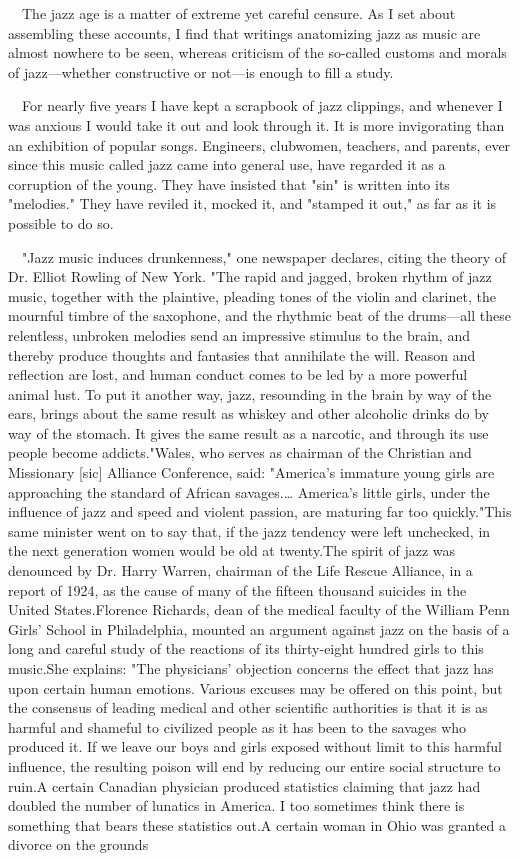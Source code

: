 \begin{gquote}
　The jazz age is a matter of extreme yet careful censure. As I set about assembling these accounts, I find that writings anatomizing jazz as music are almost nowhere to be seen, whereas criticism of the so-called customs and morals of jazz—whether constructive or not—is enough to fill a study.\par{}　For nearly five years I have kept a scrapbook of jazz clippings, and whenever I was anxious I would take it out and look through it. It is more invigorating than an exhibition of popular songs. Engineers, clubwomen, teachers, and parents, ever since this music called jazz came into general use, have regarded it as a corruption of the young. They have insisted that "sin" is written into its "melodies." They have reviled it, mocked it, and "stamped it out," as far as it is possible to do so.\par{}　"Jazz music induces drunkenness," one newspaper declares, citing the theory of Dr. Elliot Rowling of New York. "The rapid and jagged, broken rhythm of jazz music, together with the plaintive, pleading tones of the violin and clarinet, the mournful timbre of the saxophone, and the rhythmic beat of the drums—all these relentless, unbroken melodies send an impressive stimulus to the brain, and thereby produce thoughts and fantasies that annihilate the will. Reason and reflection are lost, and human conduct comes to be led by a more powerful animal lust. To put it another way, jazz, resounding in the brain by way of the ears, brings about the same result as whiskey and other alcoholic drinks do by way of the stomach. It gives the same result as a narcotic, and through its use people become addicts."Wales, who serves as chairman of the Christian and Missionary [sic] Alliance Conference, said: "America's immature young girls are approaching the standard of African savages.… America's little girls, under the influence of jazz and speed and violent passion, are maturing far too quickly."This same minister went on to say that, if the jazz tendency were left unchecked, in the next generation women would be old at twenty.The spirit of jazz was denounced by Dr. Harry Warren, chairman of the Life Rescue Alliance, in a report of 1924, as the cause of many of the fifteen thousand suicides in the United States.Florence Richards, dean of the medical faculty of the William Penn Girls' School in Philadelphia, mounted an argument against jazz on the basis of a long and careful study of the reactions of its thirty-eight hundred girls to this music.She explains: "The physicians' objection concerns the effect that jazz has upon certain human emotions. Various excuses may be offered on this point, but the consensus of leading medical and other scientific authorities is that it is as harmful and shameful to civilized people as it has been to the savages who produced it. If we leave our boys and girls exposed without limit to this harmful influence, the resulting poison will end by reducing our entire social structure to ruin.A certain Canadian physician produced statistics claiming that jazz had doubled the number of lunatics in America. I too sometimes think there is something that bears these statistics out.A certain woman in Ohio was granted a divorce on the grounds 
\end{gquote}
